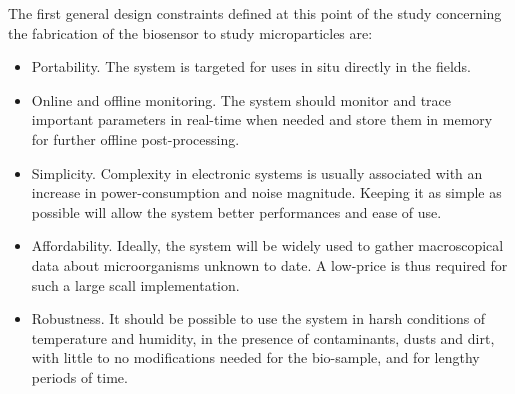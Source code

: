 The first general design constraints \cite{horowitz1989art} defined at this point of the study concerning the fabrication of the biosensor to study microparticles are:

\begin{itemize}
	\item Portability. The system is targeted for uses in situ directly in the fields.
	\item Online and offline monitoring. The system should monitor and trace important parameters in real-time when needed and store them in memory for further offline post-processing.
	\item Simplicity. Complexity in electronic systems is usually associated with an increase in power-consumption and noise magnitude. Keeping it as simple as possible will allow the system better performances and ease of use. 
	\item Affordability. Ideally, the system will be widely used to gather macroscopical data about microorganisms unknown to date. A low-price is thus required for such a large scall implementation. 
	\item Robustness. It should be possible to use the system in harsh conditions of temperature and humidity, in the presence of contaminants, dusts and dirt, with little to no modifications needed for the bio-sample, and for lengthy periods of time.
\end{itemize}
